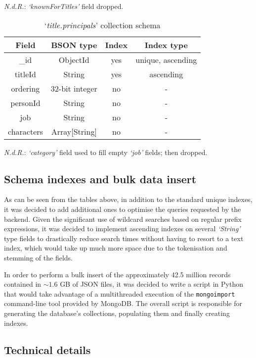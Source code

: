 \textit{N.d.R.}: \textit{`knownForTitles'} field dropped.

\begin{table}[H]
	\caption{`\textit{title.principals}' collection schema}
\begin{center}
	\begin{tabular}{ cccc }
		\hline
		Field & BSON type & Index & Index type \\
		\hline
		\_id & ObjectId & yes & unique, ascending \\
		titleId & String & yes & ascending \\
		ordering & 32-bit integer & no & - \\
		personId & String & no & - \\
		job & String & no & - \\
		characters & Array[String] & no & - \\
		\hline
	\end{tabular}
\end{center}
\end{table}

\textit{N.d.R.}: \textit{`category'} field used to fill empty \textit{`job'} fields; then dropped.

\subsection{Schema indexes and bulk data insert}

As can be seen from the tables above, in addition to the standard unique indexes, it was decided to add additional ones to optimise the queries requested by the backend.
Given the significant use of wildcard searches based on regular prefix expressions, it was decided to implement ascending indexes on several \textit{`String'} type fields to drastically reduce search times without having to resort to a text index, which would take up much more space due to the tokenisation and stemming of the fields.

In order to perform a bulk insert of the approximately 42.5 million records contained in $\sim1.6$ GB of JSON files, it was decided to write a script in Python that would take advantage of a multithreaded execution of the \verb|mongoimport| command-line tool provided by MongoDB.
The overall script is responsible for generating the database's collections, populating them and finally creating indexes.

\subsection{Technical details}

